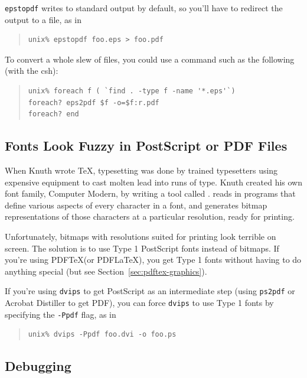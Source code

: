 \documentclass{icmmcm}
\newcommand{\pdftex}{PDF\tex}
\newcommand{\pdflatex}{PDF\latex}
\newcommand{\prog}[1]{\texttt{#1}\xspace}
\newcommand{\tex}{\TeX\xspace}
\newcommand{\latex}{\LaTeX\xspace}
\begin{document}
{\prog{epstopdf} writes to standard output by default, so you'll have
to redirect the output to a file, as in
\begin{quote}
\begin{verbatim}
unix% epstopdf foo.eps > foo.pdf
\end{verbatim}
\end{quote}

To convert a whole slew of files, you could use a command such as the
following (with the csh):

\begin{quote}
\begin{verbatim}
unix% foreach f ( `find . -type f -name '*.eps'`)
foreach? eps2pdf $f -o=$f:r.pdf
foreach? end
\end{verbatim}
\end{quote}


\subsection{Fonts Look Fuzzy in PostScript or PDF Files}%
\label{sec:fuzzy-fonts}

When Knuth wrote \tex, typesetting was done by trained typesetters
using expensive equipment to cast molten lead into runs of type.
Knuth created his own font family, Computer Modern, by writing a tool
called \MF{}.  \MF{} reads in programs that define various aspects of
every character in a font, and generates bitmap representations of
those characters at a particular resolution, ready for printing.

Unfortunately, bitmaps with resolutions suited for printing look
terrible on screen.  The solution is to use Type 1 PostScript fonts
instead of bitmaps. If you're using \pdftex (or \pdflatex), you get
Type 1 fonts without having to do anything special (but see
Section~\ref{sec:pdftex-graphics}).

If you're using \prog{dvips} to get PostScript as an intermediate step
(using \prog{ps2pdf} or Acrobat Distiller to get PDF), you can force
\prog{dvips} to use Type 1 fonts by specifying the \prog{-Ppdf} flag,
as in
\begin{quote}
\begin{verbatim}
unix% dvips -Ppdf foo.dvi -o foo.ps
\end{verbatim}
\end{quote}


\subsection{Debugging}

}
\end{document}
